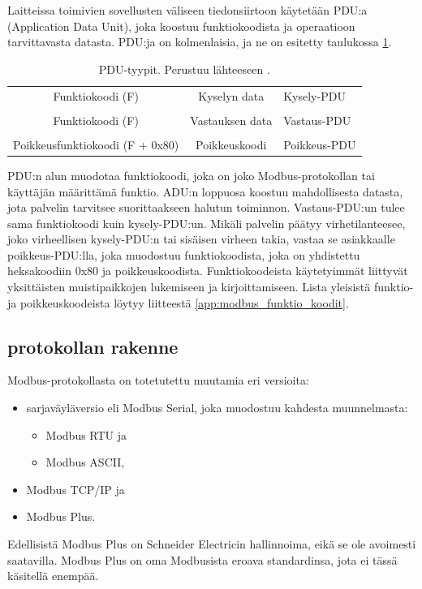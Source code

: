     Laitteissa toimivien sovellusten väliseen tiedonsiirtoon käytetään \gls{PDU}:a (Application Data Unit), joka koostuu funktiokoodista ja operaatioon tarvittavasta datasta. \gls{PDU}:ja on kolmenlaisia, ja ne on esitetty taulukossa \ref{pdu}.
    \begin{table}[h]
      \centering
      \caption[\gls{PDU}-tyypit.]{\gls{PDU}-tyypit. Perustuu lähteeseen \parencite{modbusAppSpec}.}
      \begin{tabular}{ccl}
        \cellcolor{green}Funktiokoodi (F)              & \cellcolor{green}Kyselyn data    & Kysely-PDU   \\
                                                       &                                  &              \\
        \cellcolor{green}Funktiokoodi (F)              & \cellcolor{green}Vastauksen data & Vastaus-PDU  \\
                                                       &                                  &              \\
        \cellcolor{red}Poikkeusfunktiokoodi (F + 0x80) & \cellcolor{red}Poikkeuskoodi     & Poikkeus-PDU \\
      \end{tabular}
      \label{pdu}
    \end{table}
    \gls{PDU}:n alun muodotaa funktiokoodi, joka on joko Modbus-protokollan tai käyttäjän määrittämä funktio. ADU:n loppuosa koostuu mahdollisesta datasta, jota palvelin tarvitsee suorittaakseen halutun toiminnon. Vastaus-PDU:un tulee sama funktiokoodi kuin kysely-PDU:un. Mikäli palvelin päätyy virhetilanteesee, joko virheellisen kysely-PDU:n tai sisäisen virheen takia, vastaa se asiakkaalle poikkeus-PDU:lla, joka muodostuu funktiokoodista, joka on yhdistettu heksakoodiin 0x80 ja poikkeuskoodista.\parencite{modbusAppSpec} Funktiokoodeista käytetyimmät liittyvät yksittäisten muistipaikkojen lukemiseen ja kirjoittamiseen\parencite{DincerRosen}. Lista yleisistä funktio- ja poikkeuskoodeista löytyy liitteestä \ref{app:modbus_funktio_koodit}.


  \subsection{protokollan rakenne}

    Modbus-protokollasta on totetutettu muutamia eri versioita:
    \begin{itemize}
      \item sarjaväyläversio eli Modbus Serial, joka muodostuu kahdesta muunnelmasta:
      \begin{itemize}
        \item Modbus \gls{RTU} ja
        \item Modbus ASCII,
      \end{itemize}
      \item Modbus TCP/IP ja
      \item Modbus Plus.
      \parencite{modbusAppSpec}
    \end{itemize}
    Edellisistä Modbus Plus on Schneider Electricin hallinnoima, eikä se ole avoimesti saatavilla. Modbus Plus on oma Modbusista eroava standardinsa, jota ei tässä käsitellä enempää.\parencite{seCom}


